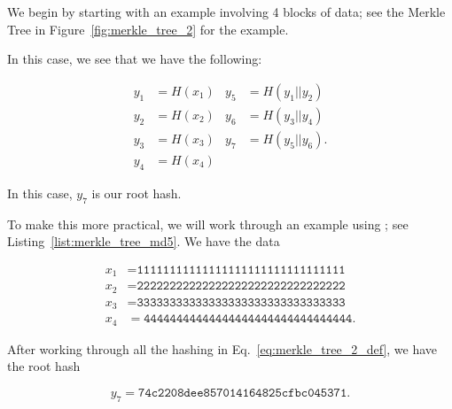 \begin{example}

We begin by starting with an example involving 4 blocks of data;
see the Merkle Tree in Figure~\ref{fig:merkle_tree_2}
for the example.



In this case, we see that we have the following:

\begin{align}
    y_{1} &= H(x_{1})
        &
    y_{5} &= H(y_{1}||y_{2}) \nonumber\\
    y_{2} &= H(x_{2})
        &
    y_{6} &= H(y_{3}||y_{4}) \nonumber\\
    y_{3} &= H(x_{3})
        &
    y_{7} &= H(y_{5}||y_{6}). \nonumber\\
    y_{4} &= H(x_{4})
    \label{eq:merkle_tree_2_def}
\end{align}

\noindent
In this case, $y_{7}$ is our root hash.

To make this more practical, we will work through an example
using \MDFive{}; see Listing~\ref{list:merkle_tree_md5}.
We have the data

\begin{align}
    x_{1} &= \texttt{11111111111111111111111111111111}
        \nonumber\\
    x_{2} &= \texttt{22222222222222222222222222222222}
        \nonumber\\
    x_{3} &= \texttt{33333333333333333333333333333333}
        \nonumber\\
    x_{4} &= \texttt{44444444444444444444444444444444}.
\end{align}



\noindent
After working through all the hashing in Eq.~\eqref{eq:merkle_tree_2_def},
we have the root hash

\begin{equation}
    y_{7} = \texttt{74c2208dee857014164825cfbc045371}.
\end{equation}
\end{example}

